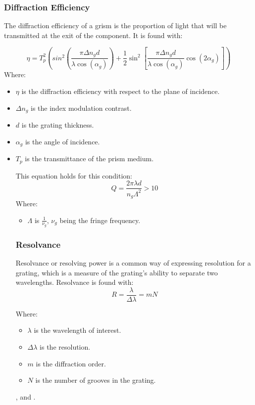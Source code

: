 \documentclass{article}
\begin{document}
\subsubsection{Diffraction Efficiency}
The diffraction efficiency of a grism is the proportion of light that will be transmitted at the exit of the component. It is found with:

\begin{equation}
\eta = T_p^2\left(sin^{2}\left(\frac{\pi \Delta n_g d}{\lambda \cos{\left(\alpha_{g}\right)}}\right) + \frac{1}{2} \sin^{2}\left[\frac{\pi \Delta n_g d}{\lambda \cos{\left(\alpha_{g}\right)}} \cos(2 \alpha_{g})\right]\right)
\end{equation}
Where: 
\begin{itemize}[label={}]
    \item $\eta$ is the diffraction efficiency with respect to the plane of incidence.
    \item $\Delta n_g$ is the index modulation contrast.
    \item $d$ is the grating thickness.
    \item $\alpha_g$ is the angle of incidence.
    \item $T_p$ is the transmittance of the prism medium.

This equation holds for this condition:
\begin{equation}
Q = \frac{2\pi\lambda d}{n_g \Lambda^2} > 10
\end{equation}
Where:
\begin{itemize}[label={}]
    \item $\Lambda$ is $\frac{1}{\nu_g}$, $\nu_g$ being the fringe frequency.
\end{itemize}

\subsubsection{Resolvance}
Resolvance or resolving power is a common way of expressing resolution for a grating, which is a measure of the grating's ability to separate two wavelengths. Resolvance is found with: 
\begin{equation}
R = \frac{\lambda}{\Delta \lambda} = mN
\end{equation}

Where:
\begin{itemize}[label={}]
    \item $\lambda$ is the wavelength of interest.
    \item $\Delta \lambda$ is the resolution.
    \item $m$ is the diffraction order.
    \item $N$ is the number of grooves in the grating. 
\end{itemize},  and  \cite{Hyperphysics}. 


\end{itemize}
\end{document}
